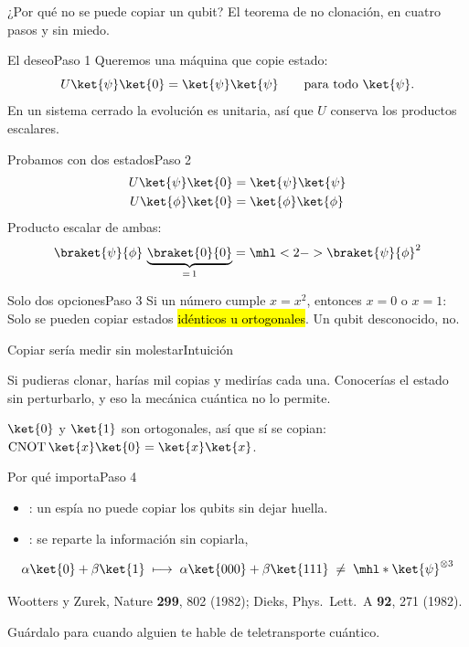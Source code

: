 \documentclass[12pt]{beamer}
\begin{document}
  {¿Por qué no se puede copiar un qubit?}
  {El teorema de no clonación, en cuatro pasos y sin miedo.}

\begin{frame}{El deseo}{Paso 1}
Queremos una máquina que copie  estado:
\[
  U\ket{\psi}\ket{0} = \ket{\psi}\ket{\psi}
  \qquad \text{para todo } \ket{\psi}.
\]
En un sistema cerrado la evolución es unitaria, así que $U$ conserva los
productos escalares.
\end{frame}

\begin{frame}{Probamos con dos estados}{Paso 2}
\begin{align*}
  U\ket{\psi}\ket{0} &= \ket{\psi}\ket{\psi}\\
  U\ket{\phi}\ket{0} &= \ket{\phi}\ket{\phi}
\end{align*}
Producto escalar de ambas:
\[
  \braket{\psi}{\phi}\,\underbrace{\braket{0}{0}}_{=\,1}
  = \mhl<2->{\braket{\psi}{\phi}^{2}}
\]
\end{frame}

\begin{frame}{Solo dos opciones}{Paso 3}
Si un número cumple $x = x^2$, entonces $x = 0$ o $x = 1$:
Solo se pueden copiar estados \hl{idénticos u ortogonales}.
Un qubit desconocido, no.
\end{frame}

\begin{frame}{Copiar sería medir sin molestar}{Intuición}
\begin{notebox}
Si pudieras clonar, harías mil copias y medirías cada una. Conocerías el
estado sin perturbarlo, y eso la mecánica cuántica no lo permite.
\end{notebox}
\begin{defbox}
$\ket{0}$ y $\ket{1}$ son ortogonales, así que sí se copian:
$\mathrm{CNOT}\,\ket{x}\ket{0} = \ket{x}\ket{x}$.
\end{defbox}
\end{frame}

\begin{frame}{Por qué importa}{Paso 4}
\begin{itemize}
  \item {}: un espía no puede copiar los qubits
        sin dejar huella.
  \item {}: se reparte la información sin copiarla,
\end{itemize}
\[
  \alpha\ket{0} + \beta\ket{1} \;\longmapsto\;
  \alpha\ket{000} + \beta\ket{111} \;\neq\; \mhl*{\ket{\psi}^{\otimes 3}}
\]
{\footnotesize\color{igMuted}Wootters y Zurek, Nature \textbf{299}, 802 (1982);
Dieks, Phys.\ Lett.\ A \textbf{92}, 271 (1982).\par}
\end{frame}

  {Guárdalo para cuando alguien te hable de teletransporte cuántico.}
\end{document}
